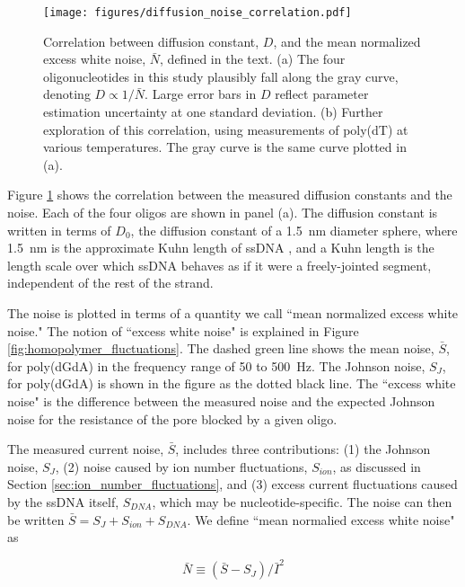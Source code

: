 \begin{figure}[h]
\begin{centering}
\texttt{[image: figures/diffusion\_noise\_correlation.pdf]}
\caption[Correlation between diffusion and noise]{Correlation between diffusion constant, $D$, and the mean normalized excess white noise, $\bar{N}$, defined in the text.  (a) The four oligonucleotides in this study plausibly fall along the gray curve, denoting $D \propto 1/\bar{N}$.  Large error bars in $D$ reflect parameter estimation uncertainty at one standard deviation.  (b) Further exploration of this correlation, using measurements of poly(dT) at various temperatures.  The gray curve is the same curve plotted in (a).}
\label{fig:diffusion_noise_correlation}
\end{centering}
\end{figure}

Figure \ref{fig:diffusion_noise_correlation} shows the correlation between the measured diffusion constants and the noise.  Each of the four oligos are shown in panel (a).  The diffusion constant is written in terms of $D_0$, the diffusion constant of a \SI{1.5}{\nm} diameter sphere, where \SI{1.5}{\nm} is the approximate Kuhn length of ssDNA \citep{Smith1996}, and a Kuhn length is the length scale over which ssDNA behaves as if it were a freely-jointed segment, independent of the rest of the strand.

The noise is plotted in terms of a quantity we call ``mean normalized excess white noise."  The notion of ``excess white noise" is explained in Figure \ref{fig:homopolymer_fluctuations}.  The dashed green line shows the mean noise, $\bar{S}$, for poly(dGdA) in the frequency range of \num{50} to \SI{500}{\Hz}.  The Johnson noise, $S_J$, for poly(dGdA) is shown in the figure as the dotted black line.  The ``excess white noise" is the difference between the measured noise and the expected Johnson noise for the resistance of the pore blocked by a given oligo.

The measured current noise, $\bar{S}$, includes three contributions: (1) the Johnson noise, $S_J$, (2) noise caused by ion number fluctuations, $S_{ion}$, as discussed in Section \ref{sec:ion_number_fluctuations}, and (3) excess current fluctuations caused by the ssDNA itself, $S_{DNA}$, which may be nucleotide-specific.  The noise can then be written $\bar{S} = S_J + S_{ion} + S_{DNA}$.  We define ``mean normalied excess white noise" as

\begin{equation}
\bar{N} \equiv (\bar{S} - S_J) / \bar{I}^2
\label{eqn:newn}
\end{equation}
 
